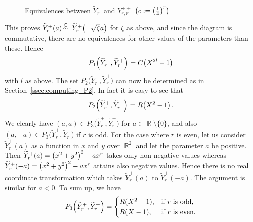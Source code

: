 \documentclass[noend]{amsproc}
\theoremstyle{definition}
\let\originalleft\left
\let\originalright\right
\renewcommand{\left}{\mathopen{}\mathclose\bgroup\originalleft}
\renewcommand{\right}{\aftergroup\egroup\originalright}
\newcommand{\tY}{\widetilde{Y}}
\DeclareMathOperator{\R}{\mathbb{R}}
\DeclareMathOperator{\C}{\mathbb{C}}
\DeclareMathOperator{\csim}{%
  \mathrel{%
    \raisebox{0pt}[\heightof{$\overset{\scriptscriptstyle\C}{\sim}$}]{%
      $\overset{\C}{\sim}$
    }
  }
}
\begin{document}
\begin{figure}
\caption{Equivalences between $\tY_r^+$ and $Y_{r,r}^{++}$%
\quad$\left(c := \left(\frac{1}{4}\right)^r\right)$}%
\label{fig:Yr}
\end{figure}

This proves $\tY_r^+(a) \csim \tY_r^+\left(\pm \sqrt{\zeta}a\right)$ for
$\zeta$ as above, and since the diagram is commutative, there are no
equivalences for other values of the parameters than these. Hence
\[
P_1\left(\tY_r^+, \tY_r^+\right) = C\left(X^{2l}-1\right)
\]
with $l$ as above. The set $P_2\bigl(\tY_r^+, \tY_r^+\bigr)$ can now be
determined as in Section~\ref{ssec:computing_P2}. In fact it is easy to see
that
\[
P_2\left(\tY_r^+, \tY_r^+\right) = R\left(X^2-1\right) \,.
\]
We clearly have $(a, a) \in P_3\bigl(\tY_r^+, \tY_r^+\bigr)$ for
$a \in \R \setminus \{0\}$, and also
$(a, -a) \in P_3\bigl(\tY_r^+, \tY_r^+\bigr)$ if $r$ is odd. For the case where
$r$ is even, let us
consider $\tY_r^+(a)$ as a function in $x$ and $y$ over $\R^2$ and let the
parameter $a$ be positive. Then $\tY_r^+(a) = \left(x^2+y^2\right)^2+ax^r$
takes only non-negative values whereas
$\tY_r^+(-a) = \left(x^2+y^2\right)^2-ax^r$ attains also negative values. Hence
there is no real coordinate transformation which takes $\tY_r^+(a)$ to
$\tY_r^+(-a)$. The argument is similar for $a < 0$. To sum up, we have
\[
P_3\left(\tY_r^+, \tY_r^+\right) =
\begin{cases}
R(X^2-1), &\text{if } r \text{ is odd}, \\
R(X-1),   &\text{if } r \text{ is even}.
\end{cases}
\]
\end{document}
